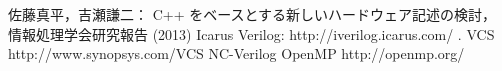 \begin{thebibliography}{99}
   佐藤真平，吉瀬謙二：
   C++ をベースとする新しいハードウェア記述の検討，
   情報処理学会研究報告 (2013)
   Icarus Verilog: http://iverilog.icarus.com/ .
   VCS http://www.synopsys.com/VCS
   NC-Verilog
   OpenMP http://openmp.org/
\end{thebibliography}
